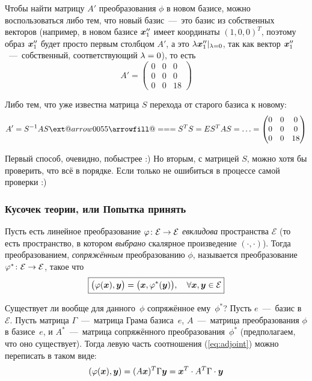 \documentclass[a4paper,12pt]{article}
\makeatletter
\newcommand*{\Relbarfill@}{\arrowfill@\Relbar\Relbar\Relbar}
\newcommand*{\xeq}[2][]{\ext@arrow 0055\Relbarfill@{#1}{#2}}
\theoremstyle{remark}
\makeatother
\begin{document}
\begin{solution}
  \medskip
  
  Чтобы найти матрицу $A'$ преобразования $\phi$ в новом базисе, можно воспользоваться либо тем, что новый базис~---~это базис из собственных векторов (например, в новом базисе $\boldsymbol x_1''$ имеет координаты $(1, 0, 0)^T$, поэтому образ $\boldsymbol x_1''$ будет просто первым столбцом $A'$, а это $\lambda \boldsymbol x_1''|_{\lambda = 0}$, так как вектор $\boldsymbol x_1''$~---~собственный, соответствующий $\lambda \hm= 0$), то есть
  \[
    A' = \begin{pmatrix}
      0 & 0 & 0\\
      0 & 0 & 0\\
      0 & 0 & 18
    \end{pmatrix}
  \]
  
  Либо тем, что уже известна матрица $S$ перехода от старого базиса к новому:
  \[
    A' = S^{-1} A S \xeq{S^T S = E} S^T A S = \ldots = \begin{pmatrix}
      0 & 0 & 0\\
      0 & 0 & 0\\
      0 & 0 & 18
    \end{pmatrix}
  \]
  
  Первый способ, очевидно, побыстрее :)
  Но вторым, с матрицей $S$, можно хотя бы проверить, что всё в порядке.
  Если только не ошибиться в процессе самой проверки :)
  \end{solution}
  
  
  
  \subsubsection{Кусочек теории, или Попытка принять}
  
  Пусть есть линейное преобразование $\phi\hm\colon \mathcal E \hm\to \mathcal E$ \emph{евклидова} пространства $\mathcal E$ (то есть пространство, в котором \emph{выбрано} скалярное произведение $(\cdot, \cdot)$).
  Тогда преобразованием, \emph{сопряжённым} преобразованию $\phi$, называется преобразование $\phi^*\hm\colon \mathcal E \hm\to \mathcal E$, такое что
  \begin{equation}\label{eq:adjoint}
    \boxed{\bigl(\varphi(\boldsymbol x), \boldsymbol y\bigr) = \bigl(\boldsymbol x, \varphi^*(\boldsymbol y)\bigr),\quad \forall \boldsymbol x, \boldsymbol y \in \mathcal E}
  \end{equation}
  
  Существует ли вообще для данного~$\phi$ сопряжённое ему~$\phi^*$?
  Пусть $e$~---~базис в $\mathcal E$.
  Пусть матрица $\Gamma$~---~матрица Грама базиса~$e$, $A$~---~матрица преобразования $\phi$ в базисе~$e$, и $A^*$~---~матрица сопряжённого преобразования~$\phi^*$ (предполагаем, что оно существует).
  Тогда левую часть соотношения (\ref{eq:adjoint}) можно переписать в таком виде:
  \[
    (\varphi(\boldsymbol x), \boldsymbol y) = (A \boldsymbol x)^T \Gamma \boldsymbol y = \boldsymbol x^T \cdot A^T \Gamma \cdot \boldsymbol y
  \]
  
\end{document}
